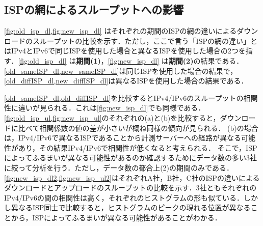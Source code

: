 \subsection{ISPの網によるスループットへの影響}
\label{subsec:isp_dl}
\cref{fig:old_isp_dl,fig:new_isp_dl} はそれぞれの期間のISPの網の違いによるダウンロードのスループットの比較を示す．ただし，ここで言う「ISPの網の違い」とはIPv4とIPv6で同じISPを使用した場合と異なるISPを使用した場合の2つを指す．\cref{fig:old_isp_dl} は{\bf 期間(1)}，\cref{fig:new_isp_dl} は{\bf 期間(2)}の結果である．\cref{old_sameISP_dl,new_sameISP_dl}は同じISPを使用した場合の結果で，\cref{old_diffISP_dl,new_diffISP_dl}は異なるISPを使用した場合の結果である．

\cref{old_sameISP_dl,old_diffISP_dl}を比較するとIPv4/IPv6のスループットの相関性に違いが見られる．これは\cref{fig:new_isp_dl}でも同様である．\cref{fig:old_isp_ul,fig:new_isp_ul}のそれぞれの(a)と(b)を比較すると，ダウンロードに比べて相関係数の値の差が小さいが概ね同様の傾向が見られる．
(b)の場合は，IPv4/IPv6で異なるISPであることから計測サーバーへの経路が異なる可能性があり，その結果IPv4/IPv6で相関性が低くなると考えられる．
そこで，ISPによってふるまいが異なる可能性があるのか確認するためにデータ数の多い3社に絞って分析を行う．ただし，データ数の都合上(2)の期間のみである．\cref{fig:new_isp_dl2,fig:new_isp_ul2}はそれぞれA社，B社，C社のISPの違いによるダウンロードとアップロードのスループットの比較を示す．3社ともそれぞれのIPv4/IPv6の間の相関性は高く，それぞれのヒストグラムの形も似ている．しかし異なるISP同士で比較すると，ヒストグラムのピークの現れる位置が異なることから，ISPによってふるまいが異なる可能性があることがわかる．

